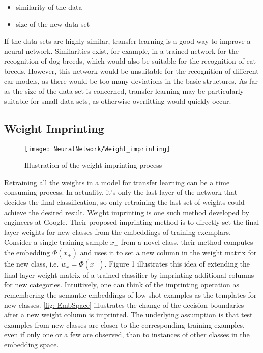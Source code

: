 \begin{itemize}
    \item similarity of the data
    \item size of the new data set
\end{itemize}

		
If the data sets are highly similar, transfer learning is a good way to improve a neural network. Similarities exist, for example, in a trained network for the recognition of dog breeds, which would also be suitable for the recognition of cat breeds. However, this network would be unsuitable for the recognition of different car models, as there would be too many deviations in the basic structures.	As far as the size of the data set is concerned, transfer learning may be particularly suitable for small data sets, as otherwise overfitting would quickly occur. \cite{Becker:2018}


\subsection{Weight Imprinting}

\begin{figure}[!h]
	\centering
	\texttt{[image: NeuralNetwork/Weight\_imprinting]}
	\caption{Illustration of the weight imprinting process \cite{Qi:2018}}
\end{figure}

Retraining all the weights in a model for transfer learning can be a time consuming process. In actuality, it's only the last layer of the network that decides the final classification, so only retraining the last set of weights could achieve the desired result. Weight imprinting is one such method developed by engineers at Google. Their proposed imprinting method is to directly set
the final layer weights for new classes from the embeddings
of training exemplars. Consider a single training sample
$x_{+}$ from a novel class, their method computes the embedding $\Phi(x_{+})$ and uses it to set a new column in the weight
matrix for the new class, i.e. $w_{x} = \Phi(x_{+})$. Figure 1 illustrates this idea of extending the final layer weight matrix
of a trained classifier by imprinting additional columns for
new categories.
Intuitively, one can think of the imprinting operation as
remembering the semantic embeddings of low-shot examples as the templates for new classes. \autoref{fig: EmbSpace} illustrates
the change of the decision boundaries after a new weight
column is imprinted. The underlying assumption is that test
examples from new classes are closer to the corresponding
training examples, even if only one or a few are observed,
than to instances of other classes in the embedding space.

